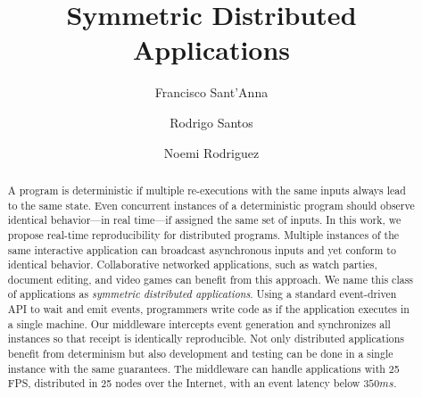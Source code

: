 \documentclass[sigplan,screen]{acmart}
\begin{document}
\title{Symmetric Distributed Applications}

\author{Francisco Sant'Anna}

\author{Rodrigo Santos}

\author{Noemi Rodriguez}


\begin{abstract}
A program is deterministic if multiple re-executions with the same inputs
always lead to the same state.
Even concurrent instances of a deterministic program should observe identical
behavior---in real time---if assigned the same set of inputs.
%
In this work, we propose real-time reproducibility for distributed programs.
Multiple instances of the same interactive application can broadcast
asynchronous inputs and yet conform to identical behavior.
Collaborative networked applications, such as watch parties, document editing,
and video games can benefit from this approach.
We name this class of applications as \emph{symmetric distributed applications}.
%
Using a standard event-driven API to wait and emit events, programmers write
code as if the application executes in a single machine.
Our middleware intercepts event generation and synchronizes all instances so
that receipt is identically reproducible.
Not only distributed applications benefit from determinism but also development
and testing can be done in a single instance with the same guarantees.
The middleware can handle applications with 25 FPS, distributed in 25 nodes
over the Internet, with an event latency below $350ms$.
\end{abstract}

\end{document}
